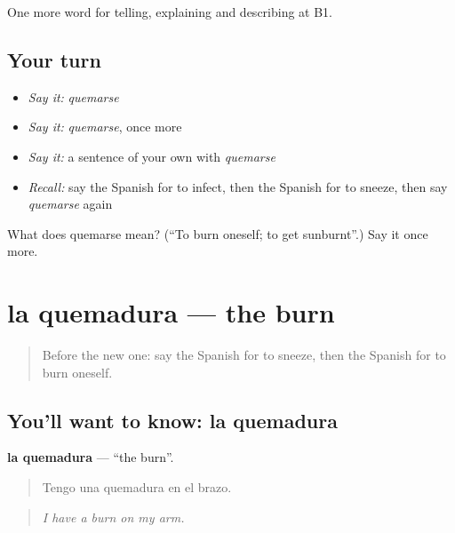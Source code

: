 \begin{grammarlens}[title={What you've built}]
One more word for telling, explaining and describing at B1.
\end{grammarlens}

\subsection*{Your turn}
\begin{itemize}
\raggedright
  \item \emph{Say it:} \emph{quemarse}
  \item \emph{Say it:} \emph{quemarse}, once more
  \item \emph{Say it:} a sentence of your own with \emph{quemarse}
  \item \emph{Recall:} say the Spanish for to infect, then the Spanish for to sneeze, then say \emph{quemarse} again
\end{itemize}

\begin{tcolorbox}[breakable,colback=teal!4,colframe=teal!35!black,title={Before you move on}]
What does quemarse mean? (\textquotedblleft{}To burn oneself; to get sunburnt\textquotedblright{}.) Say it once more.
\end{tcolorbox}
\section[la quemadura]{la quemadura — the burn}

\label{lesson:ES-C734-quemadura}



\begin{quote}
Before the new one: say the Spanish for to sneeze, then the Spanish for to burn oneself.
\end{quote}

\subsection*{You'll want to know: la quemadura}
\textbf{la quemadura} — \textquotedblleft{}the burn\textquotedblright{}.

\begin{quote}
Tengo una quemadura en el brazo.
\end{quote}

\begin{quote}
\emph{I have a burn on my arm.}
\end{quote}

